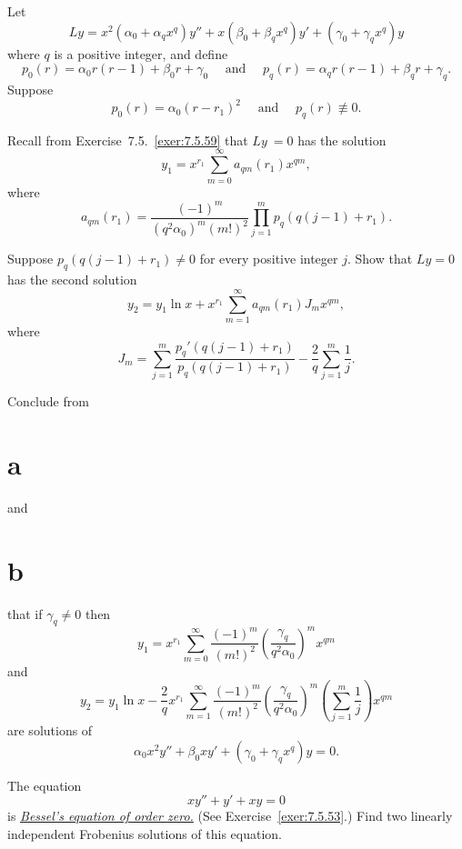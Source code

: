 \begin{exerciselist}
  \item\label{exer:7.6.55} Let
  \[
    Ly=x^{2}(\alpha_{0}+\alpha_{q}x^{q})y''+x(\beta_{0}+\beta_{q}x^{q})y'+(\gamma_{0}+\gamma_{q}x^{q})y
  \]
  where $q$ is a positive integer, and define
  \[
    p_{0}(r)=\alpha_{0}r(r-1)+\beta_{0}r+\gamma_{0}\quad\mbox{ and }\quad p_{q}(r)=\alpha_{q}r(r-1)+\beta_{q}r+\gamma_{q}.
  \]
  Suppose
  \[
    p_{0}(r)=\alpha_{0}(r-r_{1})^{2}\quad\mbox{ and }\quad p_{q}(r)\not\equiv0.
  \]
  \begin{alist}
    \item %
    Recall from Exercise~7.5.~\hspace*{-3pt}\ref{exer:7.5.59} that $Ly~=0$ has the solution
    \[
      y_{1}=x^{r_{1}}\sum_{m=0}^{\infty}a_{qm}(r_{1})x^{qm},
    \]
    where
    \[
      a_{qm}(r_{1})=\frac{(-1)^{m}}{(q^{2}\alpha_{0})^{m}(m!)^{2}}\prod_{j=1}^{m}p_{q}\left(q(j-1)+r_{1}\right).
    \]

    \item %
    Suppose $p_{q}(q(j-1)+r_{1})\ne0$ for every positive integer $j$.
    Show that $Ly=0$ has the second solution
    \[
      y_{2}=y_{1}\ln x+x^{r_{1}}\sum_{m=1}^{\infty}a_{qm}(r_{1})J_{m}x^{qm},
    \]
    where
    \[
      J_{m}=\sum_{j=1}^{m}\frac{p_{q}'\left(q(j-1)+r_{1}\right)}{p_{q}\left(q(j-1)+r_{1}\right)}-\frac{2}{q}\sum_{j=1}^{m}\frac{1}{j}.
    \]

    \item %
    Conclude from \part{a} and \part{b} that if $\gamma_{q}\ne0$ then
    \[
      y_{1}=x^{r_{1}}\sum_{m=0}^{\infty}\frac{(-1)^{m}}{(m!)^{2}}\left(\frac{\gamma_{q}}{q^{2}\alpha_{0}}\right)^{m}x^{qm}
    \]
    and
    \[
      y_{2}=y_{1}\ln x-\frac{2}{q}x^{r_{1}}\sum_{m=1}^{\infty}\frac{(-1)^{m}}{(m!)^{2}}\left(\frac{\gamma_{q}}{q^{2}\alpha_{0}}\right)^{m}\left(\sum_{j=1}^{m}\frac{1}{j}\right)x^{qm}
    \]
    are solutions of
    \[
      \alpha_{0}x^{2}y''+\beta_{0}xy'+(\gamma_{0}+\gamma_{q}x^{q})y=0.
    \]
  \end{alist}

  \item\label{exer:7.6.56} The equation
  \[
    xy''+y'+xy=0
  \]
  is
  \href{https://mathshistory.st-andrews.ac.uk/Biographies/Bessel/}{\color{blue}
  \it Bessel's equation of order zero.\/}
  (See Exercise~\ref{exer:7.5.53}.) Find two linearly independent Frobenius solutions of this
  equation.


\end{exerciselist}
